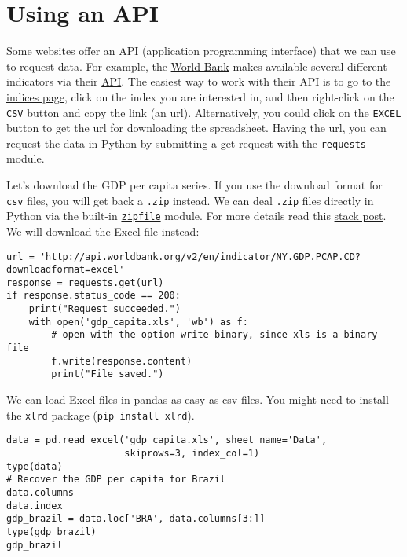 \documentclass[12pt, a4paper]{article}
\begin{document}
\section{Using an API}
\label{sec:org2d412ab}
Some websites offer an API (application programming interface) that we can use to request data.
For example, the \href{https://data.worldbank.org/indicator}{World Bank} makes available several different indicators via their \href{https://datahelpdesk.worldbank.org/knowledgebase/articles/889392-about-the-indicators-api-documentation}{API}.
The easiest way to work with their API is to go to the \href{https://data.worldbank.org/indicator}{indices page}, click on the index you are interested in, and then right-click on the \texttt{CSV} button and copy the link (an url).
Alternatively, you could click on the \texttt{EXCEL} button to get the url for downloading the spreadsheet.
Having the url, you can request the data in Python by submitting a get request with the \texttt{requests} module.

Let's download the GDP per capita series.
If you use the download format for \texttt{csv} files, you will get back a \texttt{.zip} instead.
We can deal \texttt{.zip} files directly in Python via the built-in \href{https://docs.python.org/3/library/zipfile.html}{\texttt{zipfile}} module.
For more details read this \href{https://stackoverflow.com/questions/9419162/download-returned-zip-file-from-url}{stack post}.
We will download the Excel file instead:
\lstset{language=jupyter-python,label= ,caption= ,captionpos=b,numbers=none}
\begin{lstlisting}
url = 'http://api.worldbank.org/v2/en/indicator/NY.GDP.PCAP.CD?downloadformat=excel'
response = requests.get(url)
if response.status_code == 200:
    print("Request succeeded.")
    with open('gdp_capita.xls', 'wb') as f:
        # open with the option write binary, since xls is a binary file
        f.write(response.content)
        print("File saved.")
\end{lstlisting}

We can load Excel files in pandas as easy as csv files.
You might need to install the \texttt{xlrd} package (\texttt{pip install xlrd}).
\lstset{language=jupyter-python,label= ,caption= ,captionpos=b,numbers=none}
\begin{lstlisting}
data = pd.read_excel('gdp_capita.xls', sheet_name='Data',
                     skiprows=3, index_col=1)
type(data)
# Recover the GDP per capita for Brazil
data.columns
data.index
gdp_brazil = data.loc['BRA', data.columns[3:]]
type(gdp_brazil)
gdp_brazil
\end{lstlisting}
\end{document}

